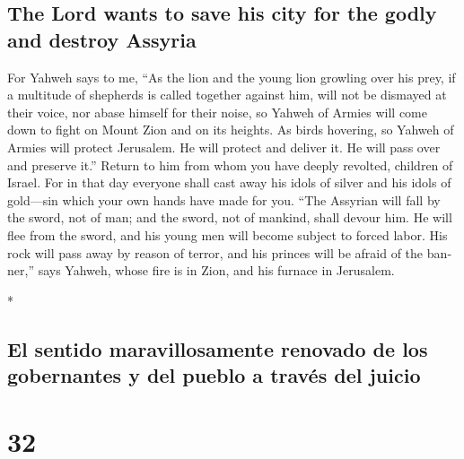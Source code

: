 \begin{paracol}{2}
\begin{otherlanguage}{english}
\hypertarget{the-lord-wants-to-save-his-city-for-the-godly-and-destroy-assyria}{%
\subsection{The Lord wants to save his city for the godly and destroy
Assyria}\label{the-lord-wants-to-save-his-city-for-the-godly-and-destroy-assyria}}

 For Yahweh says to me, ``As the lion and the young lion
growling over his prey, if a multitude of shepherds is called together
against him, will not be dismayed at their voice, nor abase himself for
their noise, so Yahweh of Armies will come down to fight on Mount Zion
and on its heights.  As birds hovering, so Yahweh of
Armies will protect Jerusalem. He will protect and deliver it. He will
pass over and preserve it.''  Return to him from whom you
have deeply revolted, children of Israel.  For in that day
everyone shall cast away his idols of silver and his idols of gold---sin
which your own hands have made for you.  ``The Assyrian
will fall by the sword, not of man; and the sword, not of mankind, shall
devour him. He will flee from the sword, and his young men will become
subject to forced labor.  His rock will pass away by
reason of terror, and his princes will be afraid of the banner,'' says
Yahweh, whose fire is in Zion, and his furnace in Jerusalem.

\end{otherlanguage}

\switchcolumn[0]*

\hypertarget{el-sentido-maravillosamente-renovado-de-los-gobernantes-y-del-pueblo-a-travuxe9s-del-juicio}{%
\subsection{El sentido maravillosamente renovado de los gobernantes y
del pueblo a través del
juicio}\label{el-sentido-maravillosamente-renovado-de-los-gobernantes-y-del-pueblo-a-travuxe9s-del-juicio}}

\hypertarget{section-62}{%
\section{32}\label{section-62}}


\end{paracol}
